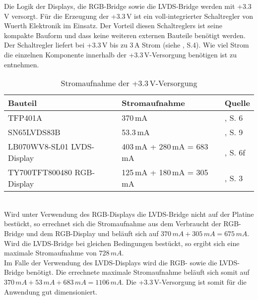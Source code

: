 Die Logik der Displays, die RGB-Bridge  sowie die LVDS-Bridge  werden mit +3.3\,V versorgt. Für die Erzeugung der +3.3\,V ist ein voll-integrierter Schaltregler  von Wuerth Elektronik im Einsatz. Der Vorteil diesen Schaltreglers ist seine kompakte Bauform und dass keine weiteren externen Bauteile benötigt werden. Der Schaltregler liefert bei +3.3\,V bis zu 3\,A Strom (siehe \cite{Wuerth2013}, S.4). Wie viel Strom die einzelnen Komponente innerhalb der +3.3\,V-Versorgung benötigen ist  zu entnehmen.
\begin{table}[h]
\begin{tabular}{|p{3cm}|p{5cm}|p{4.5cm}|}\hline
\rowcolor{TableBackgroundColor} 
   \textbf{Bauteil} & \textbf{Stromaufnahme} & \textbf{Quelle}	\\ \hline
    TFP401A & 370\,mA & \cite{TI2011}, S. 6\\ \hline
	SN65LVDS83B & 53.3\,mA & \cite{TI2011b}, S. 9\\ \hline
	LB070WV8-SL01 LVDS-Display & 403\,mA + 280\,mA = 683\,mA & \cite{LG2012}, S. 6f\\  \hline
	TY700TFT800480 RGB-Display & 125\,mA + 180\,mA = 305\,mA & \cite{Techtoys2012}, S. 3\\ \hline
\end{tabular}
\caption{Stromaufnahme der +3.3\,V-Versorgung}
\label{tab:3_3v_strom}
\end{table} \\
Wird unter Verwendung des RGB-Displays die LVDS-Bridge nicht auf der Platine bestückt, so errechnet sich die Stromaufnahme aus dem Verbraucht der RGB-Bridge und dem RGB-Display und beläuft sich auf  $370\,mA + 305\,mA = 675\,mA$. Wird die LVDS-Bridge bei gleichen Bedingungen bestückt, so ergibt sich eine maximale Stromaufnahme von $728\,mA$.\\
Im Falle der Verwendung des LVDS-Displays wird die RGB- sowie die LVDS-Bridge benötigt. Die errechnete maximale Stromaufnahme beläuft sich somit auf $370\,mA + 53\,mA + 683\,mA = 1106\,mA$. Die +3.3\,V-Versorgung ist somit für die Anwendung gut dimensioniert.\newline

